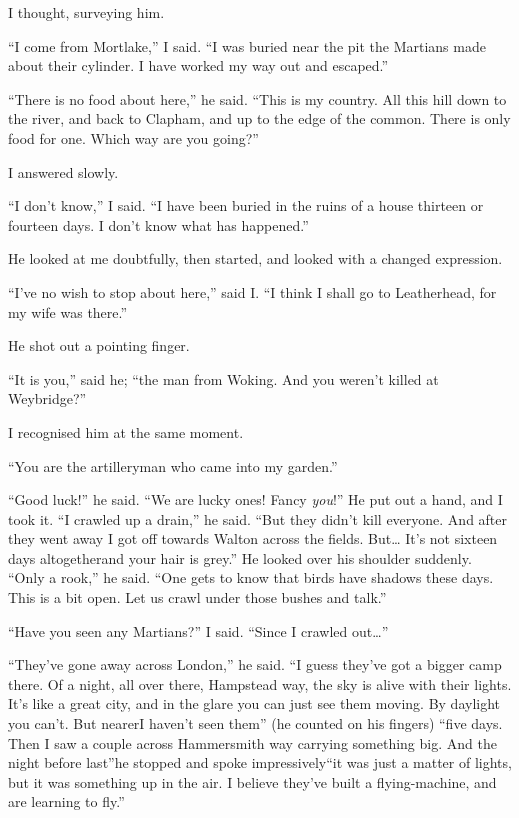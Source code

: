 I thought, surveying him.

``I come from Mortlake,'' I said. ``I was buried near the pit the
Martians made about their cylinder. I have worked my way out and
escaped.''

``There is no food about here,'' he said. ``This is my country. All
this hill down to the river, and back to Clapham, and up to the
edge of the common. There is only food for one. Which way are you
going?''

I answered slowly.

``I don't know,'' I said. ``I have been buried in the ruins of a house
thirteen or fourteen days. I don't know what has happened.''

He looked at me doubtfully, then started, and looked with a changed
expression.

``I've no wish to stop about here,'' said I. ``I think I shall go to
Leatherhead, for my wife was there.''

He shot out a pointing finger.

``It is you,'' said he; ``the man from Woking. And you weren't killed
at Weybridge?''

I recognised him at the same moment.

``You are the artilleryman who came into my garden.''

``Good luck!'' he said. ``We are lucky ones! Fancy \emph{you}!'' He put
out a hand, and I took it. ``I crawled up a drain,'' he said. ``But
they didn't kill everyone. And after they went away I got off
towards Walton across the fields. But\ldots{} It's not sixteen days
altogether\dash{}and your hair is grey.'' He looked over his shoulder
suddenly. ``Only a rook,'' he said. ``One gets to know that birds have
shadows these days. This is a bit open. Let us crawl under those
bushes and talk.''

``Have you seen any Martians?'' I said. ``Since I crawled out\ldots{}''

``They've gone away across London,'' he said. ``I guess they've got a
bigger camp there. Of a night, all over there, Hampstead way, the
sky is alive with their lights. It's like a great city, and in the
glare you can just see them moving. By daylight you can't. But
nearer\dash{}I haven't seen them\dash{}'' (he counted on his fingers) ``five
days. Then I saw a couple across Hammersmith way carrying something
big. And the night before last''\dash{}he stopped and spoke
impressively\dash{}``it was just a matter of lights, but it was something
up in the air. I believe they've built a flying-machine, and are
learning to fly.''

